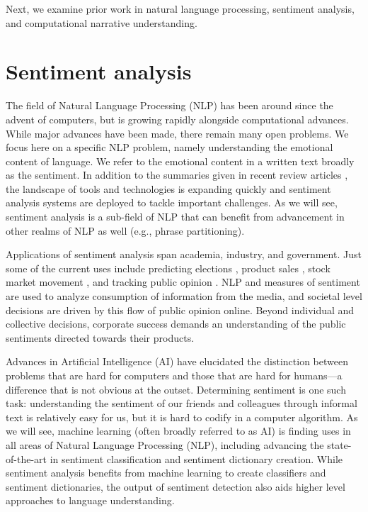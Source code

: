 Next, we examine prior work in natural language processing, sentiment analysis, and computational narrative understanding.

\section{Sentiment analysis}

The field of Natural Language Processing (NLP) has been around since the advent of computers, but is growing rapidly alongside computational advances.
While major advances have been made, there remain many open problems.
We focus here on a specific NLP problem, namely understanding the emotional content of language.
We refer to the emotional content in a written text broadly as the sentiment.
In addition to the summaries given in recent review articles \citep{giachanou2016like}, the landscape of tools and technologies is expanding quickly and sentiment analysis systems are deployed to tackle important challenges.
As we will see, sentiment analysis is a sub-field of NLP that can benefit from advancement in other realms of NLP as well (e.g., phrase partitioning).

Applications of sentiment analysis span academia, industry, and government.
Just some of the current uses include predicting elections \citep{tumasjan2010predicting}, product sales \citep{liu2007arsa}, stock market movement \citep{bar2011identifying}, and tracking public opinion \citep{cody2015climate}.
NLP and measures of sentiment are used to analyze consumption of information from the media, and societal level decisions are driven by this flow of public opinion online.
Beyond individual and collective decisions, corporate success demands an understanding of the public sentiments directed towards their products.

Advances in Artificial Intelligence (AI) have elucidated the distinction between problems that are hard for computers and those that are hard for humans---a difference that is not obvious at the outset.
Determining sentiment is one such task: understanding the sentiment of our friends and colleagues through informal text is relatively easy for us, but it is hard to codify in a computer algorithm.
As we will see, machine learning (often broadly referred to as AI) is finding uses in all areas of Natural Language Processing (NLP), including advancing the state-of-the-art in sentiment classification and sentiment dictionary creation.
While sentiment analysis benefits from machine learning to create classifiers and sentiment dictionaries, the output of sentiment detection also aids higher level approaches to language understanding.

